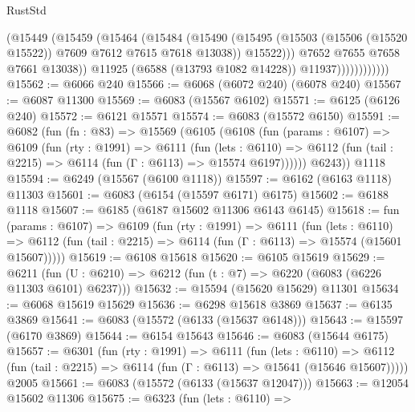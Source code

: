 \begin{lexlean}{RustStd}
\begin{coremodule}
                            (@15449
                              (@15459
                                (@15464
                                  (@15484
                                    (@15490
                                      (@15495
                                        (@15503
                                          (@15506 (@15520 @15522))
                                          @7609
                                          @7612
                                          @7615
                                          @7618
                                          @13038))
                                      @15522)))
                                @7652
                                @7655
                                @7658
                                @7661
                                @13038))
                            @11925
                            (@6588 (@13793 @1082 @14228))
                            @11937))))))))))))
@15562 := @6066 @240
@15566 := @6068 (@6072 @240) (@6078 @240)
@15567 := @6087 @11300
@15569 := @6083 (@15567 @6102)
@15571 := @6125 (@6126 @240)
@15572 := @6121 @15571
@15574 := @6083 (@15572 @6150)
@15591 := @6082
    (fun (fn : @83) =>
    @15569
      (@6105
        (@6108
          (fun (params : @6107) =>
          @6109
            (fun (rty : @1991) =>
            @6111
              (fun (lets : @6110) =>
              @6112 (fun (tail : @2215) => @6114 (fun (Γ : @6113) => @15574 @6197))))))
        @6243))
    @1118
@15594 := @6249 (@15567 (@6100 @1118))
@15597 := @6162 (@6163 @1118) @11303
@15601 := @6083 (@6154 (@15597 @6171) @6175)
@15602 := @6188 @1118
@15607 := @6185 (@6187 @15602 @11306 @6143 @6145)
@15618 := fun (params : @6107) =>
  @6109
    (fun (rty : @1991) =>
    @6111
      (fun (lets : @6110) =>
      @6112 (fun (tail : @2215) => @6114 (fun (Γ : @6113) => @15574 (@15601 @15607)))))
@15619 := @6108 @15618
@15620 := @6105 @15619
@15629 := @6211
    (fun (U : @6210) => @6212 (fun (t : @7) => @6220 (@6083 (@6226 @11303 @6101) @6237)))
@15632 := @15594 (@15620 @15629) @11301
@15634 := @6068 @15619 @15629
@15636 := @6298 @15618 @3869
@15637 := @6135 @3869
@15641 := @6083 (@15572 (@6133 (@15637 @6148)))
@15643 := @15597 (@6170 @3869)
@15644 := @6154 @15643
@15646 := @6083 (@15644 @6175)
@15657 := @6301
    (fun (rty : @1991) =>
    @6111
      (fun (lets : @6110) =>
      @6112 (fun (tail : @2215) => @6114 (fun (Γ : @6113) => @15641 (@15646 @15607)))))
    @2005
@15661 := @6083 (@15572 (@6133 (@15637 @12047)))
@15663 := @12054 @15602 @11306
@15675 := @6323
    (fun (lets : @6110) =>

\end{coremodule}
\end{lexlean}
